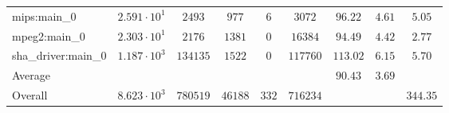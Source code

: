 \begin{tabular}{|l|c|c|c|c|c|c|c|c|}
mips:main\_0            & $ 2.591 \cdot 10^{1} $ & $ 2493   $ & $ 977   $ & $ 6   $ & $ 3072   $ & $ 96.22       $ & $ 4.61    $ & $ 5.05    $ \\
mpeg2:main\_0           & $ 2.303 \cdot 10^{1} $ & $ 2176   $ & $ 1381  $ & $ 0   $ & $ 16384  $ & $ 94.49       $ & $ 4.42    $ & $ 2.77    $ \\
sha\_driver:main\_0     & $ 1.187 \cdot 10^{3} $ & $ 134135 $ & $ 1522  $ & $ 0   $ & $ 117760 $ & $ 113.02      $ & $ 6.15    $ & $ 5.70    $ \\
\hline
Average                 & $                    $ & $        $ & $       $ & $     $ & $        $ & $ 90.43       $ & $ 3.69    $ & $         $ \\
\hline
Overall                 & $ 8.623 \cdot 10^{3} $ & $ 780519 $ & $ 46188 $ & $ 332 $ & $ 716234 $ & $             $ & $         $ & $ 344.35  $ \\
\hline
\end{tabular}
